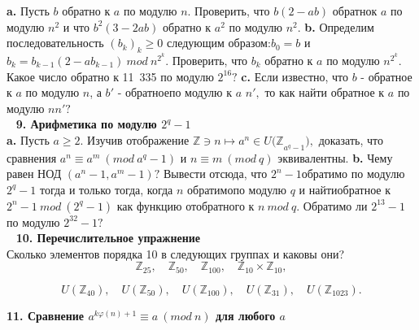 \documentclass{mai_book}
\begin{document}
\textbf{a.} Пусть $b$ обратно к $a$ по модулю $n$. Проверить, что $b(2-ab)$ обратно\newline к $a$ по модулю $n^2$ и что $b^2(3-2ab)$ обратно к $a^2$ по модулю $n^2$.\newline
\hspace*{15pt}\textbf{b.} Определим последовательность ${(b_k)}_k\geqslant0$ следующим образом:\newline $b_0=b$ и $b_k=b_{k-1}(2-ab_{k-1})\ mod\ n^{2^k}.$ Проверить, что $b_k$ обратно к $a$ по модулю $n^{2^k}.$ Какое число обратно к 11\ 335 по модулю $2^{16}?$\newline
\hspace*{15pt}\textbf{c.} Если известно, что $b$ - обратное к $a$ по модулю $n$, а $b'$ - обратное\newline по модулю к $a$ $n',$ то как найти обратное к $a$ по модулю $nn'?$\\
\ \newline
\noindent\textbf{9. Арифметика по модулю $2^q-1$}\\

\textbf{a.} Пусть $a\geqslant2.$ Изучив отображение $\mathbb{Z} \ni n \mapsto a^n \in U{(\mathbb{Z}}_{a^q-1}),$ доказать, что сравнения $a^n \equiv a^m\ (mod\ a^q-1)$ и $n\equiv m\ (mod\ q)$ эквивалентны.\newline
\hspace*{15pt}\textbf{b.} Чему равен НОД $(a^n-1,a^m-1)?$ Вывести отсюда, что $2^n-1$\newline обратимо по модулю $2^q-1$ тогда и только тогда, когда $n$ обратимо\newline по модулю $q$ и найтиобратное к $2^n-1\ mod\ (2^q-1)$ как функцию от\newline обратного к $n\ mod\ q.$ Обратимо ли $2^{13}-1$ по модулю $2^{32}-1?$\\
\ \newline
    \noindent\textbf{10. Перечислительное упражнение}\\
    
Сколько элементов порядка 10 в следующих группах и каковы они?
    $$
    {\mathbb{Z}}_{25},\quad \mathbb{Z}_{50},\quad \mathbb{Z}_{100},\quad \mathbb{Z}_{10}\times\mathbb{Z}_{10},
    $$    
    
    $$
    U(\mathbb{Z}_{40}),\quad U(\mathbb{Z}_{50}),\quad U(\mathbb{Z}_{100}),\quad U(\mathbb{Z}_{31}),\quad U(\mathbb{Z}_{1023}).
    $$
    
\newpage

\noindent\textbf{11. Сравнение $a^{k\varphi(n)+1}\equiv a\ (mod\ n)$ для любого $a$}\\
\end{document}
